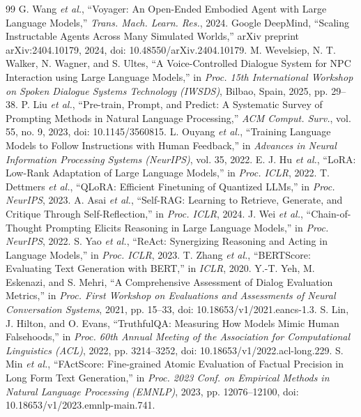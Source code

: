 ﻿\documentclass[a4paper,12pt]{article}
\begin{document}
\begin{thebibliography}{99}
 G. Wang \emph{et al.}, ``Voyager: An Open-Ended Embodied Agent with Large Language Models,'' \emph{Trans. Mach. Learn. Res.}, 2024.
 Google DeepMind, ``Scaling Instructable Agents Across Many Simulated Worlds,'' arXiv preprint arXiv:2404.10179, 2024, doi: 10.48550/arXiv.2404.10179.
 M. Wevelsiep, N. T. Walker, N. Wagner, and S. Ultes, ``A Voice-Controlled Dialogue System for NPC Interaction using Large Language Models,'' in \emph{Proc. 15th International Workshop on Spoken Dialogue Systems Technology (IWSDS)}, Bilbao, Spain, 2025, pp. 29--38.
 P. Liu \emph{et al.}, ``Pre-train, Prompt, and Predict: A Systematic Survey of Prompting Methods in Natural Language Processing,'' \emph{ACM Comput. Surv.}, vol. 55, no. 9, 2023, doi: 10.1145/3560815.
 L. Ouyang \emph{et al.}, ``Training Language Models to Follow Instructions with Human Feedback,'' in \emph{Advances in Neural Information Processing Systems (NeurIPS)}, vol. 35, 2022.
 E. J. Hu \emph{et al.}, ``LoRA: Low-Rank Adaptation of Large Language Models,'' in \emph{Proc. ICLR}, 2022.
 T. Dettmers \emph{et al.}, ``QLoRA: Efficient Finetuning of Quantized LLMs,'' in \emph{Proc. NeurIPS}, 2023.
 A. Asai \emph{et al.}, ``Self-RAG: Learning to Retrieve, Generate, and Critique Through Self-Reflection,'' in \emph{Proc. ICLR}, 2024.
 J. Wei \emph{et al.}, ``Chain-of-Thought Prompting Elicits Reasoning in Large Language Models,'' in \emph{Proc. NeurIPS}, 2022.
 S. Yao \emph{et al.}, ``ReAct: Synergizing Reasoning and Acting in Language Models,'' in \emph{Proc. ICLR}, 2023.
 T. Zhang \emph{et al.}, ``BERTScore: Evaluating Text Generation with BERT,'' in \emph{ICLR}, 2020.
 Y.-T. Yeh, M. Eskenazi, and S. Mehri, ``A Comprehensive Assessment of Dialog Evaluation Metrics,'' in \emph{Proc. First Workshop on Evaluations and Assessments of Neural Conversation Systems}, 2021, pp. 15--33, doi: 10.18653/v1/2021.eancs-1.3.
 S. Lin, J. Hilton, and O. Evans, ``TruthfulQA: Measuring How Models Mimic Human Falsehoods,'' in \emph{Proc. 60th Annual Meeting of the Association for Computational Linguistics (ACL)}, 2022, pp. 3214--3252, doi: 10.18653/v1/2022.acl-long.229.
 S. Min \emph{et al.}, ``FActScore: Fine-grained Atomic Evaluation of Factual Precision in Long Form Text Generation,'' in \emph{Proc. 2023 Conf. on Empirical Methods in Natural Language Processing (EMNLP)}, 2023, pp. 12076--12100, doi: 10.18653/v1/2023.emnlp-main.741.

\end{thebibliography}
\end{document}
